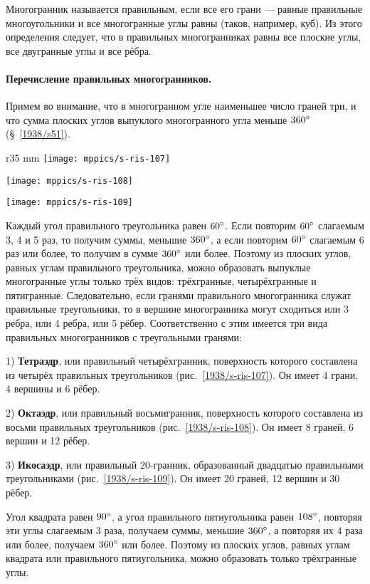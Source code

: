 Многогранник называется правильным, если все его грани — равные правильные многоугольники и все многогранные углы равны (таков, например, куб).
Из этого определения следует, что в правильных многогранниках равны все плоские углы, все двугранные углы и все рёбра.

\paragraph{Перечисление правильных многогранников.}\label{1938/s97}
Примем во внимание, что в многогранном угле наименьшее число граней три, и что сумма плоских углов выпуклого многогранного угла меньше $360\degree$ (§~\ref{1938/s51}).

\begin{wrapfigure}{r}{35 mm}
\vskip-0mm
\centering
\texttt{[image: mppics/s-ris-107]}
\caption{}\label{1938/s-ris-107}
\bigskip
\texttt{[image: mppics/s-ris-108]}
\caption{}\label{1938/s-ris-108}
\bigskip
\texttt{[image: mppics/s-ris-109]}
\caption{}\label{1938/s-ris-109}
\vskip-0mm
\end{wrapfigure}

Каждый угол правильного треугольника равен $60\degree$.
Если повторим $60\degree$ слагаемым 3, 4 и 5 раз, то получим суммы, меньшие $360\degree$, а если повторим $60\degree$ слагаемым 6 раз или более, то получим в сумме $360\degree$ или более.
Поэтому из плоских углов, равных углам правильного треугольника, можно образовать выпуклые многогранные углы только трёх видов: трёхгранные, четырёхгранные и пятигранные.
Следовательно, если гранями правильного многогранника служат правильные треугольники, то в вершине многогранника могут сходиться или 3 ребра, или 4 ребра, или 5 рёбер.
Соответственно с этим имеется три вида правильных многогранников с треугольными гранями:

1) \textbf{Тетраэдр}, или правильный четырёхгранник, поверхность которого составлена из четырёх правильных треугольников (рис.~\ref{1938/s-ris-107}).
Он имеет 4 грани, 4 вершины и 6 рёбер.

2) \textbf{Октаэдр}, или правильный восьмигранник, поверхность которого составлена из восьми правильных треугольников (рис.~\ref{1938/s-ris-108}).
Он имеет 8 граней, 6 вершин и 12 рёбер.

3) \textbf{Икосаэдр}, или правильный 20-гранник, образованный двадцатью правильными треугольниками (рис.~\ref{1938/s-ris-109}).
Он имеет 20 граней, 12 вершин и 30 рёбер.

Угол квадрата равен $90\degree$, а угол правильного пятиугольника равен $108\degree$, повторяя эти углы слагаемым 3 раза, получаем суммы, меньшие $360\degree$, а повторяя их 4 раза или более, получаем $360\degree$ или более.
Поэтому из плоских углов, равных углам квадрата или правильного пятиугольника, можно образовать только трёхгранные углы.

